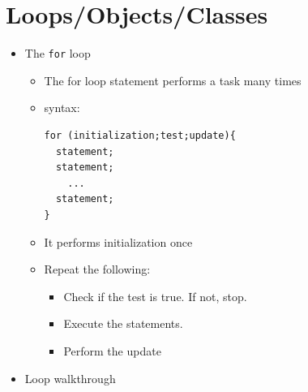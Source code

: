 \documentclass[a4paper]{article}
\newcommand{\inline}[1]{\lstinline!#1!}%
\begin{document}
\section{Loops/Objects/Classes}
    \begin{itemize}
      \item The {\inline{for}} loop
        \begin{itemize}
          \item The for loop statement performs a task many times
          \item syntax:
            \begin{lstlisting}
for (initialization;test;update){
  statement;
  statement;
    ...
  statement;
}
            \end{lstlisting}
            \item It performs initialization once
            \item Repeat the following:
              \begin{itemize}
                \item Check if the test is true. If not, stop.
                \item Execute the statements.
                \item Perform the update
              \end{itemize}
        \end{itemize}
      \item Loop walkthrough  


\end{itemize}
\end{document}
